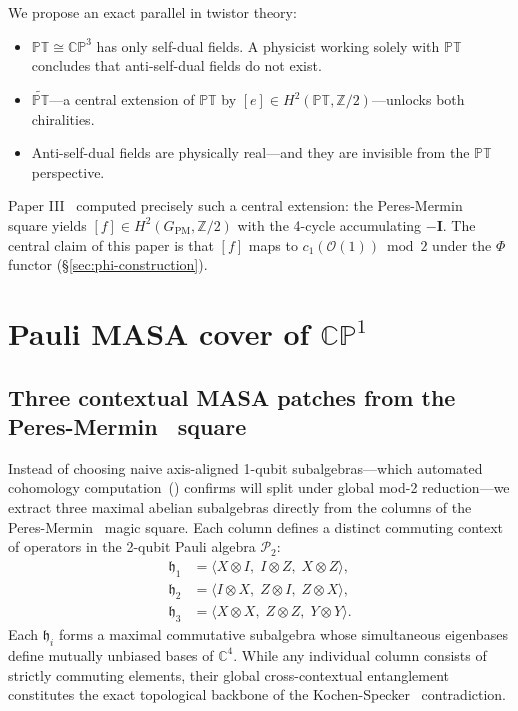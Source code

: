 \documentclass[11pt,a4paper]{article}
\theoremstyle{remark}
\newcommand{\PT}{\mathbb{PT}}
\newcommand{\CP}{\mathbb{CP}}
\newcommand{\C}{\mathbb{C}}
\newcommand{\Z}{\mathbb{Z}}
\newcommand{\cO}{\mathcal{O}}
\newcommand{\PP}{\mathcal{P}}
\begin{document}
We propose an exact parallel in twistor theory:
\begin{itemize}
  \item $\PT \cong \CP^3$ has only self-dual fields. A physicist
    working solely with $\PT$ concludes that anti-self-dual fields
    do not exist.
  \item $\widetilde{\PT}$---a central extension of $\PT$ by
    $[e] \in H^2(\PT, \Z/2)$---unlocks both chiralities.
  \item Anti-self-dual fields are physically real---and they are
    invisible from the $\PT$ perspective.
\end{itemize}

Paper III~\cite{PaperIII} computed precisely such a central extension:
the Peres-Mermin~\cite{PeresMermin} square yields $[f] \in H^2(G_{\text{PM}}, \Z/2)$
with the 4-cycle accumulating $-\mathbf{I}$. The central claim of
this paper is that $[f]$ maps to $c_1(\cO(1)) \bmod 2$ under the
$\Phi$ functor (\S\ref{sec:phi-construction}).

\section{Pauli MASA cover of $\CP^1$}
\label{sec:masa-cp1}

\subsection{Three contextual MASA patches from the Peres-Mermin~\cite{PeresMermin} square}

Instead of choosing naive axis-aligned 1-qubit subalgebras---which
automated cohomology computation~(\cite{ScriptConj42}) confirms
will split under global mod-2 reduction---we extract three maximal
abelian subalgebras directly from the columns of the
Peres-Mermin~\cite{PeresMermin} magic square. Each column defines a
distinct commuting context of
operators in the 2-qubit Pauli algebra $\PP_2$:
\begin{align*}
  \mathfrak{h}_1 &= \langle X \otimes I,\; I \otimes Z,\; X \otimes Z \rangle,\\
  \mathfrak{h}_2 &= \langle I \otimes X,\; Z \otimes I,\; Z \otimes X \rangle,\\
  \mathfrak{h}_3 &= \langle X \otimes X,\; Z \otimes Z,\; Y \otimes Y \rangle.
\end{align*}
Each $\mathfrak{h}_i$ forms a maximal commutative subalgebra whose
simultaneous eigenbases define mutually unbiased bases of $\C^4$.
While any individual column consists of strictly commuting elements,
their global cross-contextual entanglement constitutes the exact
topological backbone of the Kochen-Specker~\cite{KochenSpecker} contradiction.
\end{document}
